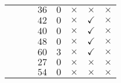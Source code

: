\documentclass[12pt,a4paper,halfparskip,headsepline,bibtotocnumbered]{scrreprt}
\theoremstyle{nummermitklammern}
\theoremstyle{nonumberbreak}
\begin{document}
\begin{table}[H]
\begin{tabular}{|c|c|c|c|c|c|c|c|}
								&						&							&$36$	&$0$	&$\times$		&$\times$		&$\times$\\ \cline{4-8}
								&						&							&$42$	&$0$	&$\times$		&$\checkmark$	&$\times$\\ \cline{4-8}
								&						&							&$40$	&$0$	&$\times$		&$\checkmark$	&$\times$\\ \cline{4-8}
								&						&							&$48$	&$0$	&$\times$		&$\checkmark$	&$\times$\\ \cline{4-8}
								&						&							&$60$	&$3$	&$\times$		&$\checkmark$	&$\times$\\ \cline{4-8}
								&						&							&$27$	&$0$	&$\times$		&$\times$		&$\times$\\ \cline{4-8}
								&						&							&$54$	&$0$	&$\times$		&$\times$		&$\times$\\ \hline
	\end{tabular}
\end{table}
\end{document}
